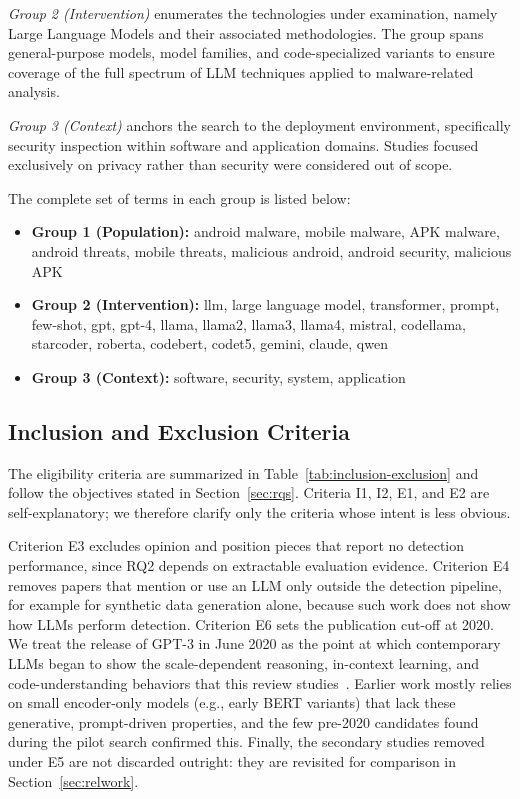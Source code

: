 \textit{Group 2 (Intervention)} enumerates the technologies under examination, namely Large Language Models and their associated methodologies. The group spans general-purpose models, model families, and code-specialized variants to ensure coverage of the full spectrum of LLM techniques applied to malware-related analysis.

\textit{Group 3 (Context)} anchors the search to the deployment environment, specifically security inspection within software and application domains. Studies focused exclusively on privacy rather than security were considered out of scope.

The complete set of terms in each group is listed below:

\begin{itemize}
    \item \textbf{Group 1 (Population):} android malware, mobile malware, APK malware, android threats, mobile threats, malicious android, android security, malicious APK
    \item \textbf{Group 2 (Intervention):} llm, large language model, transformer, prompt, few-shot, gpt, gpt-4, llama, llama2, llama3, llama4, mistral, codellama, starcoder, roberta, codebert, codet5, gemini, claude, qwen
    \item \textbf{Group 3 (Context):} software, security, system, application
\end{itemize}

\subsection{Inclusion and Exclusion Criteria}\label{sec:criteria}

The eligibility criteria are summarized in Table~\ref{tab:inclusion-exclusion} and follow the objectives stated in Section~\ref{sec:rqs}. Criteria I1, I2, E1, and E2 are self-explanatory; we therefore clarify only the criteria whose intent is less obvious.

Criterion E3 excludes opinion and position pieces that report no detection performance, since RQ2 depends on extractable evaluation evidence. Criterion E4 removes papers that mention or use an LLM only outside the detection pipeline, for example for synthetic data generation alone, because such work does not show how LLMs perform detection. Criterion E6 sets the publication cut-off at 2020. We treat the release of GPT-3 in June 2020 as the point at which contemporary LLMs began to show the scale-dependent reasoning, in-context learning, and code-understanding behaviors that this review studies~\cite{brown2020gpt3}. Earlier work mostly relies on small encoder-only models (e.g., early BERT variants) that lack these generative, prompt-driven properties, and the few pre-2020 candidates found during the pilot search confirmed this. Finally, the secondary studies removed under E5 are not discarded outright: they are revisited for comparison in Section~\ref{sec:relwork}.

